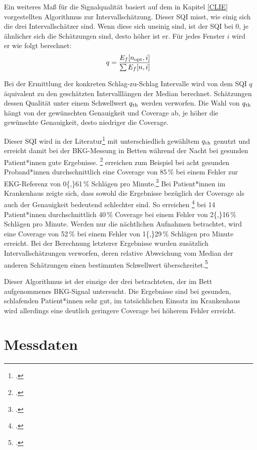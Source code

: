 	Ein weiteres Maß für die Signalqualität basiert auf dem in Kapitel \ref{CLIE} vorgestellten Algorithmus zur Intervallschätzung. Dieser \acl{SQI} misst, wie einig sich die drei Intervallschätzer sind. Wenn diese sich uneinig sind, ist der \ac{SQI} bei 0, je ähnlicher sich die Schätzungen sind, desto höher ist er. Für jedes Fenster $i$ wird er wie folgt berechnet: \[ q = \frac{E_f[n\textsubscript{opt}, i]}{\sum E_f[n, i]} \] %
	
	Bei der Ermittlung der konkreten Schlag-zu-Schlag Intervalle wird von dem \ac{SQI} $q$ äquivalent zu den geschätzten Intervalllängen der Median berechnet. Schätzungen dessen Qualität unter einem Schwellwert $q\textsubscript{th}$ werden verworfen. Die Wahl von $q\textsubscript{th}$ hängt von der gewünschten Genauigkeit und Coverage ab, je höher die gewünschte Genauigkeit, desto niedriger die Coverage.
	
	Dieser \ac{SQI} wird in der Literatur\footcite[Bspw.][]{HoogAntink2020, Zink2017} mit unterschiedlich gewähltem $q\textsubscript{th}$ genutzt und erreicht damit bei der \ac{BKG}-Messung in Betten während der Nacht bei gesunden Patient*innen gute Ergebnisse. \citeauthor{Bruser2013}\footcite{Bruser2013} erreichen zum Beispiel bei acht gesunden Proband*innen durchschnittlich eine Coverage von $85\,\%$ bei einem Fehler zur \ac{EKG}-Referenz von \num{0{,}61}\,\% Schlägen pro Minute.\footcite{Bruser2013} Bei Patient*innen im Krankenhaus zeigte sich, dass sowohl die Ergebnisse bezüglich der Coverage als auch der Genauigkeit bedeutend schlechter sind. So erreichen \citeauthor{HoogAntink2020}\footcite{HoogAntink2020} bei 14 Patient*innen durchschnittlich \num{40}\,\% Coverage bei einem Fehler von \num{2{,}16}\,\% Schlägen pro Minute. Werden nur die nächtlichen Aufnahmen betrachtet, wird eine Coverage von \num{52}\,\% bei einem Fehler von \num{1{,}29}\,\% Schlägen pro Minute erreicht. Bei der Berechnung letzterer Ergebnisse wurden zusätzlich Intervallschätzungen verworfen, deren relative Abweichung vom Median der anderen Schätzungen einen bestimmten Schwellwert überschreitet.\footcite{HoogAntink2020}
	
	Dieser Algorithmus ist der einzige der drei betrachteten, der im Bett aufgenommenes \ac{BKG}-Signal untersucht. Die Ergebnisse sind bei gesunden, schlafenden Patient*innen sehr gut, im tatsächlichen Einsatz im Krankenhaus wird allerdings eine deutlich geringere Coverage bei höherem Fehler erreicht.
	
\section{Messdaten}

